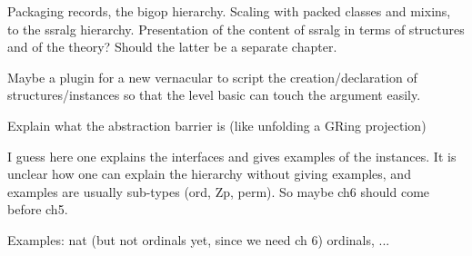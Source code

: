 
Packaging records, the bigop hierarchy.
Scaling with packed classes and mixins, to the ssralg
hierarchy. Presentation of the content of ssralg in terms of structures
and of the theory? Should the latter be a separate chapter.

Maybe a plugin for a new vernacular to script the creation/declaration
of structures/instances so that the level basic can touch the argument
easily.

Explain what the abstraction barrier is (like unfolding a GRing projection)


I guess here one explains the interfaces and gives examples of the instances.
It is unclear how one can explain the hierarchy without giving examples,
and examples are usually sub-types (ord, Zp, perm).  So maybe ch6 should
come before ch5.

\mcbPROVIDE{}
\mcbREQUIRE{}


Examples: nat (but not ordinals yet, since we need ch 6) ordinals, ...


